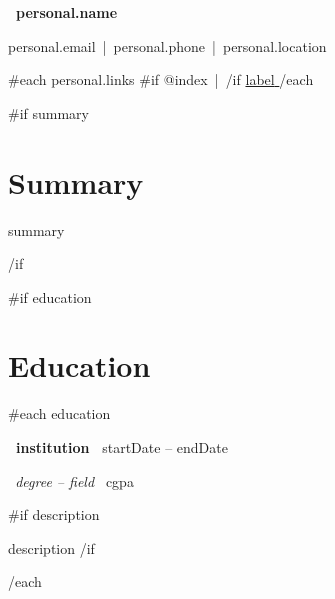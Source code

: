 \documentclass[10pt,a4paper]{article}
\begin{document}

\begin{center}

    {\LARGE \textbf{ {{~personal.name~}} }}

    \vspace{3pt}

    {{personal.email}}
    \,|\, 
    {{personal.phone}}
    \,|\, 
    {{personal.location}}

    \vspace{2pt}

    {{#each personal.links}}
        {{#if @index}} \,|\, {{/if}}
        \href{ {{url}} }{ {{label}} }
    {{/each}}

\end{center}



{{#if summary}}

\section{Summary}

{{summary}}

{{/if}}



{{#if education}}

\section{Education}

{{#each education}}

\textbf{ {{~institution~}} }
\hfill
{{startDate}} -- {{endDate}}

\vspace{1pt}

\textit{ {{~degree}} -- {{field~}} }
\hfill
{{cgpa}}

{{#if description}}
\vspace{1pt}

{{description}}
{{/if}}

\vspace{3pt}

{{/each}}
\end{document}
